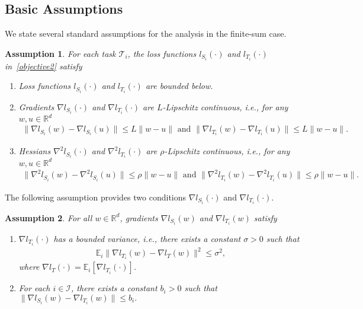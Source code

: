 \documentclass{osudissert96}
\newtheorem{assum}{Assumption}
\begin{document}
\subsection*{Basic Assumptions} 
We state several standard assumptions  for the analysis in the finite-sum case.  
\begin{assum}\label{assum:smoothoff}
	For each task $\mathcal{T}_i$, the loss functions $l_{S_i}(\cdot)$ and  $l_{T_i}(\cdot)$
	in~\cref{objective2} satisfy
	\begin{enumerate}
		\item Loss functions $l_{S_i}(\cdot)$ and $l_{T_i}(\cdot)$ are bounded below.
		\item Gradients $\nabla l_{S_i}(\cdot)$ and  $\nabla l_{T_i}(\cdot)$ are $L$-Lipschitz continuous, i.e.,  for any $w,u\in\mathbb{R}^d$
		\begin{align*}
		\|\nabla l_{S_i}(w)-\nabla l_{S_i}(u)\| \leq L\|w-u\| \text{ and }
		\|\nabla l_{T_i}(w)-\nabla l_{T_i}(u)\| \leq L\|w-u\|.
		\end{align*}
		\item  Hessians $\nabla^2 l_{S_i}(\cdot)$ and  $\nabla^2 l_{T_i}(\cdot)$ are  $\rho$-Lipschitz continuous, i.e., for any $w,u\in\mathbb{R}^d$
		\begin{align*}
		\|\nabla^2l_{S_i}(w)-\nabla^2l_{S_i}(u)\| \leq \rho\|w-u\| \text{ and }	\|\nabla^2l_{T_i}(w)-\nabla^2l_{T_i}(u)\| \leq \rho\|w-u\|.
		\end{align*}
	\end{enumerate}
\end{assum}
The following assumption provides  two conditions   $\nabla l_{S_i}(\cdot)$ and  $\nabla l_{T_i}(\cdot)$. 
\begin{assum}\label{assum:vaoff}
	For all $w\in\mathbb{R}^d$, gradients $\nabla l_{S_i}(w)$ and  $\nabla l_{T_i}(w)$ satisfy
	\begin{enumerate}
		\item $\nabla l_{T_i}(\cdot)$ has a bounded variance, i.e., there exists a constant $\sigma>0$ such that 
		\begin{align*}
		\mathbb{E}_{i}\|\nabla  l_{T_i}(w) - \nabla  l_{T}(w)\|^2 \leq \sigma^2,
		\end{align*}
		where $\nabla l_{T}(\cdot) =\mathbb{E}_{i} \left [ \nabla l_{T_i}(\cdot)\right]$. 
		\item For each $i\in \mathcal{I}$, there exists a constant $b_i>0$ such that $\|\nabla l_{S_i}(w)-\nabla l_{T_i}(w)\| \leq b_i.$
	\end{enumerate}
\end{assum}
\end{document}
